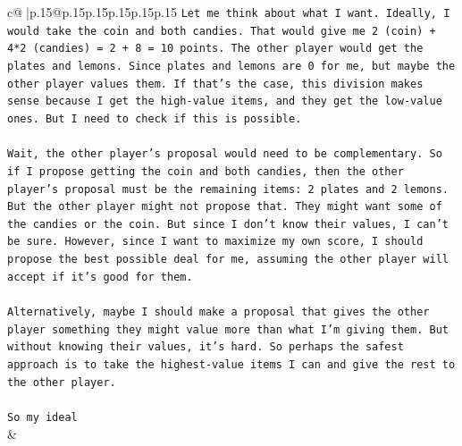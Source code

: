 \documentclass{article}
\begin{document}
{\begin{supertabular}{c@{$\;$}|p{.15\linewidth}@{}p{.15\linewidth}p{.15\linewidth}p{.15\linewidth}p{.15\linewidth}p{.15\linewidth}}
{{{\texttt{Let me think about what I want. Ideally, I would take the coin and both candies. That would give me 2 (coin) + 4*2 (candies) = 2 + 8 = 10 points. The other player would get the plates and lemons. Since plates and lemons are 0 for me, but maybe the other player values them. If that's the case, this division makes sense because I get the high{-}value items, and they get the low{-}value ones. But I need to check if this is possible.} \\
\\ 
\texttt{Wait, the other player's proposal would need to be complementary. So if I propose getting the coin and both candies, then the other player's proposal must be the remaining items: 2 plates and 2 lemons. But the other player might not propose that. They might want some of the candies or the coin. But since I don't know their values, I can't be sure. However, since I want to maximize my own score, I should propose the best possible deal for me, assuming the other player will accept if it's good for them.} \\
\\ 
\texttt{Alternatively, maybe I should make a proposal that gives the other player something they might value more than what I'm giving them. But without knowing their values, it's hard. So perhaps the safest approach is to take the highest{-}value items I can and give the rest to the other player.} \\
\\ 
\texttt{So my ideal} \\
            }
        }
    }
    & \\ \\


\end{supertabular}}
\end{document}
